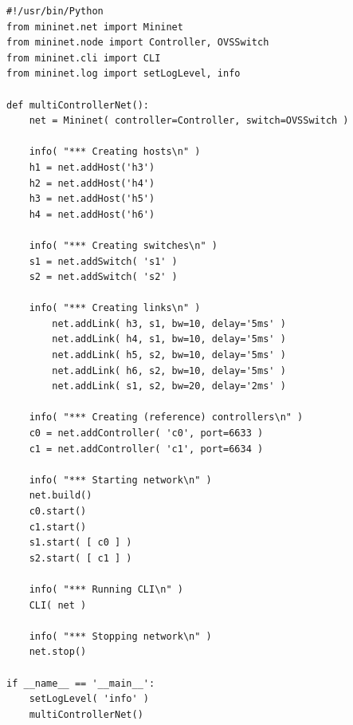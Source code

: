 \begin{minipage}{\linewidth}
\begin{lstlisting}[label=lst:activity-1-script, caption=the complete Python script required for Activity 1]
#!/usr/bin/Python
from mininet.net import Mininet
from mininet.node import Controller, OVSSwitch
from mininet.cli import CLI
from mininet.log import setLogLevel, info

def multiControllerNet():
    net = Mininet( controller=Controller, switch=OVSSwitch )

    info( "*** Creating hosts\n" )
    h1 = net.addHost('h3')
    h2 = net.addHost('h4')
    h3 = net.addHost('h5')
    h4 = net.addHost('h6')

    info( "*** Creating switches\n" )
    s1 = net.addSwitch( 's1' )
    s2 = net.addSwitch( 's2' )

    info( "*** Creating links\n" )
		net.addLink( h3, s1, bw=10, delay='5ms' )
		net.addLink( h4, s1, bw=10, delay='5ms' )
		net.addLink( h5, s2, bw=10, delay='5ms' )
		net.addLink( h6, s2, bw=10, delay='5ms' )
		net.addLink( s1, s2, bw=20, delay='2ms' )

    info( "*** Creating (reference) controllers\n" )
    c0 = net.addController( 'c0', port=6633 )
    c1 = net.addController( 'c1', port=6634 )

    info( "*** Starting network\n" )
    net.build()
    c0.start()
    c1.start()
    s1.start( [ c0 ] )
    s2.start( [ c1 ] )

    info( "*** Running CLI\n" )
    CLI( net )

    info( "*** Stopping network\n" )
    net.stop()

if __name__ == '__main__':
    setLogLevel( 'info' )
    multiControllerNet()
\end{lstlisting}
\end{minipage}
